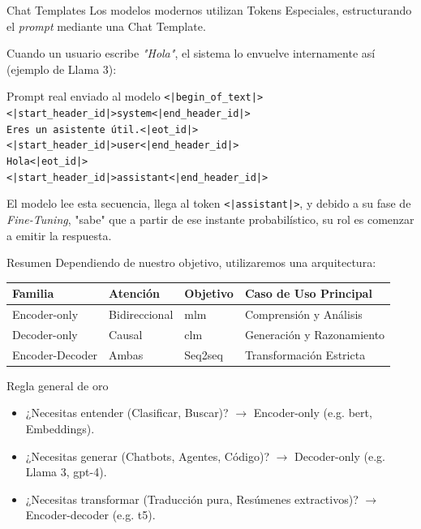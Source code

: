 \begin{frame}{Chat Templates}
Los modelos modernos utilizan \alert{Tokens Especiales}, estructurando el \textit{prompt} mediante una \alert{Chat Template}.

Cuando un usuario escribe \textit{"Hola"}, el sistema lo envuelve internamente así (ejemplo de Llama 3):
\begin{block}{Prompt real enviado al modelo}
\small
\texttt{<|begin\_of\_text|><|start\_header\_id|>system<|end\_header\_id|>\\
Eres un asistente útil.<|eot\_id|>\\
<|start\_header\_id|>user<|end\_header\_id|>\\
Hola<|eot\_id|>\\
\alert{<|start\_header\_id|>assistant<|end\_header\_id|>}}
\end{block}

El modelo lee esta secuencia, llega al token \texttt{<|assistant|>}, y debido a su fase de \textit{Fine-Tuning}, "sabe" que a partir de ese instante probabilístico, su rol es comenzar a \alert{emitir la respuesta}.
\end{frame}

\begin{frame}{Resumen}
Dependiendo de nuestro objetivo, utilizaremos una arquitectura:

\begin{table}[]
\centering
\small
\begin{tabular}{|l|l|l|l|}
\hline
\textbf{Familia} & \textbf{Atención} & \textbf{Objetivo } & \textbf{Caso de Uso Principal} \\ \hline
Encoder-only & Bidireccional &\gls{mlm} & \alert{Comprensión y Análisis} \\ \hline
Decoder-only & Causal & \gls{clm} & \alert{Generación y Razonamiento} \\ \hline
Encoder-Decoder & Ambas & Seq2seq & \alert{Transformación Estricta} \\ \hline
\end{tabular}
\end{table}

\begin{block}{Regla general de oro}
\begin{itemize}
    \item ¿Necesitas \alert{entender} (Clasificar, Buscar)? $\rightarrow$ Encoder-only (e.g. \gls{bert}, Embeddings).
    \item ¿Necesitas \alert{generar} (Chatbots, Agentes, Código)? $\rightarrow$ Decoder-only (e.g. Llama 3, \gls{gpt}-4).
    \item ¿Necesitas \alert{transformar} (Traducción pura, Resúmenes extractivos)? $\rightarrow$ Encoder-decoder (e.g. \gls{t5}).
\end{itemize}
\end{block}
\end{frame}

